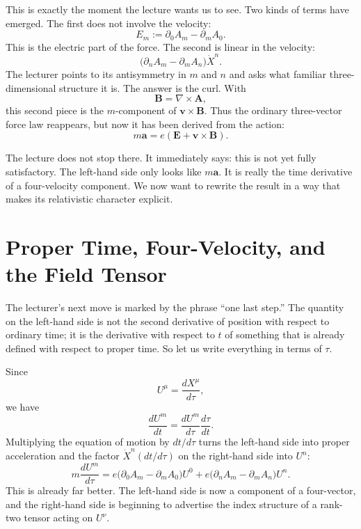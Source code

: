 This is exactly the moment the lecture wants us to see. Two kinds of terms have emerged. The first does not involve the velocity:
\begin{equation}
E_m:=\partial_0A_m-\partial_mA_0.
\end{equation}
This is the electric part of the force. The second is linear in the velocity:
\begin{equation}
\bigl(\partial_nA_m-\partial_mA_n\bigr)\dot X^n.
\end{equation}
The lecturer points to its antisymmetry in \(m\) and \(n\) and asks what familiar three-dimensional structure it is. The answer is the curl. With
\begin{equation}
\mathbf B=\nabla\times\mathbf A,
\end{equation}
this second piece is the \(m\)-component of \(\mathbf v\times\mathbf B\). Thus the ordinary three-vector force law reappears, but now it has been derived from the action:
\begin{equation}
m\mathbf a=e\left(\mathbf E+\mathbf v\times\mathbf B\right).
\end{equation}

The lecture does not stop there. It immediately says: this is not yet fully satisfactory. The left-hand side only looks like \(m\mathbf a\). It is really the time derivative of a four-velocity component. We now want to rewrite the result in a way that makes its relativistic character explicit.

\section{Proper Time, Four-Velocity, and the Field Tensor}

The lecturer's next move is marked by the phrase ``one last step.'' The quantity on the left-hand side is not the second derivative of position with respect to ordinary time; it is the derivative with respect to \(t\) of something that is already defined with respect to proper time. So let us write everything in terms of \(\tau\).

Since
\begin{equation}
U^\mu=\frac{dX^\mu}{d\tau},
\end{equation}
we have
\begin{equation}
\frac{dU^m}{dt}
=
\frac{dU^m}{d\tau}\frac{d\tau}{dt}.
\end{equation}
Multiplying the equation of motion by \(dt/d\tau\) turns the left-hand side into proper acceleration and the factor \(\dot X^n(dt/d\tau)\) on the right-hand side into \(U^n\):
\begin{equation}
m\frac{dU^m}{d\tau}
=
e\bigl(\partial_0A_m-\partial_mA_0\bigr)U^0
+
e\bigl(\partial_nA_m-\partial_mA_n\bigr)U^n.
\end{equation}
This is already far better. The left-hand side is now a component of a four-vector, and the right-hand side is beginning to advertise the index structure of a rank-two tensor acting on \(U^\nu\).

